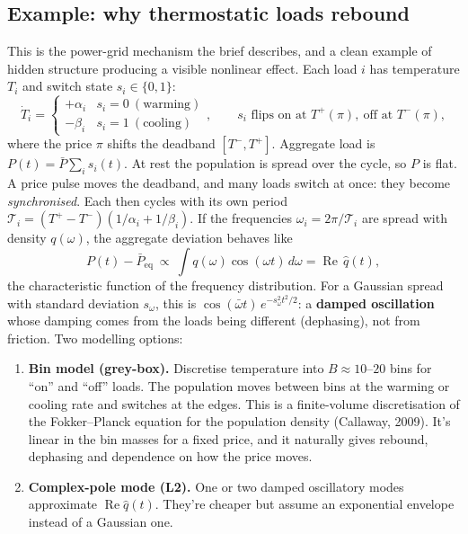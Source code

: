 \documentclass[11pt]{article}
\theoremstyle{plain}
\theoremstyle{definition}
\theoremstyle{remark}
\begin{document}
\subsection{Example: why thermostatic loads rebound}\label{sec:tcl}
This is the power-grid mechanism the brief describes, and a clean example of hidden structure producing a visible nonlinear effect. Each load $i$ has temperature $T_i$ and switch state $s_i\in\{0,1\}$:
\begin{equation}
\dot T_i=\begin{cases}+\alpha_i&s_i=0\ (\text{warming})\\-\beta_i&s_i=1\ (\text{cooling})\end{cases},\qquad s_i\text{ flips on at } T^+(\pi),\ \text{off at }T^-(\pi),
\end{equation}
where the price $\pi$ shifts the deadband $[T^-,T^+]$. Aggregate load is $P(t)=\bar P\sum_i s_i(t)$. At rest the population is spread over the cycle, so $P$ is flat. A price pulse moves the deadband, and many loads switch at once: they become \emph{synchronised}. Each then cycles with its own period $\mathcal T_i=(T^+-T^-)(1/\alpha_i+1/\beta_i)$. If the frequencies $\omega_i=2\pi/\mathcal T_i$ are spread with density $q(\omega)$, the aggregate deviation behaves like
\begin{equation}
P(t)-\bar P_{\text{eq}}\ \propto\ \int q(\omega)\cos(\omega t)\,d\omega=\operatorname{Re}\,\hat q(t),
\end{equation}
the characteristic function of the frequency distribution. For a Gaussian spread with standard deviation $s_\omega$, this is $\cos(\bar\omega t)\,e^{-s_\omega^2t^2/2}$: a \textbf{damped oscillation} whose damping comes from the loads being different (dephasing), not from friction. Two modelling options:
\begin{enumerate}
\item \textbf{Bin model (grey-box).} Discretise temperature into $B\approx10$--$20$ bins for ``on'' and ``off'' loads. The population moves between bins at the warming or cooling rate and switches at the edges. This is a finite-volume discretisation of the Fokker--Planck equation for the population density (Callaway, 2009). It's linear in the bin masses for a fixed price, and it naturally gives rebound, dephasing and dependence on how the price moves.
\item \textbf{Complex-pole mode (L2).} One or two damped oscillatory modes approximate $\operatorname{Re}\hat q(t)$. They're cheaper but assume an exponential envelope instead of a Gaussian one.
\end{enumerate}
\end{document}
